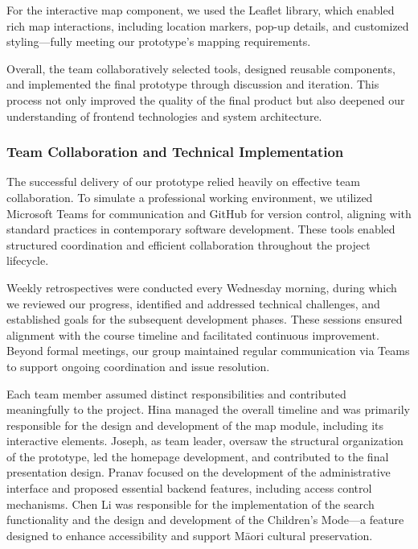 For the interactive map component, we used the Leaflet library, which enabled rich map interactions, including location markers, pop-up details, and customized styling—fully meeting our prototype’s mapping requirements.

Overall, the team collaboratively selected tools, designed reusable components, and implemented the final prototype through discussion and iteration. This process not only improved the quality of the final product but also deepened our understanding of frontend technologies and system architecture.

\subsubsection{Team Collaboration and Technical Implementation}

The successful delivery of our prototype relied heavily on effective team collaboration. To simulate a professional working environment, we utilized Microsoft Teams for communication and GitHub for version control, aligning with standard practices in contemporary software development. These tools enabled structured coordination and efficient collaboration throughout the project lifecycle.

Weekly retrospectives were conducted every Wednesday morning, during which we reviewed our progress, identified and addressed technical challenges, and established goals for the subsequent development phases. These sessions ensured alignment with the course timeline and facilitated continuous improvement. Beyond formal meetings, our group maintained regular communication via Teams to support ongoing coordination and issue resolution.

Each team member assumed distinct responsibilities and contributed meaningfully to the project. Hina managed the overall timeline and was primarily responsible for the design and development of the map module, including its interactive elements. Joseph, as team leader, oversaw the structural organization of the prototype, led the homepage development, and contributed to the final presentation design. Pranav focused on the development of the administrative interface and proposed essential backend features, including access control mechanisms. Chen Li was responsible for the implementation of the search functionality and the design and development of the Children’s Mode—a feature designed to enhance accessibility and support Māori cultural preservation.

